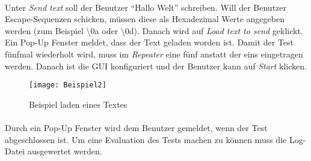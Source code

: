 \newpage

\paragraph{}
Unter \textit{Send text} soll der Benutzer "`Hallo Welt"' schreiben. Will der Benutzer Escape-Sequenzen schicken, müssen diese als Hexadezimal Werte angegeben werden (zum Beispiel \textbackslash0a oder \textbackslash0d). Danach wird auf \textit{Load text to send} geklickt. Ein Pop-Up Fenster meldet, dass der Text geladen worden ist. Damit der Test fünfmal wiederholt wird, muss im \textit{Repeater} eine fünf anstatt der eins eingetragen werden. Danach ist die GUI konfiguriert und der Benutzer kann auf \textit{Start} klicken.\\

\begin{figure}[h]
  \begin{center}
    \texttt{[image: Beispiel2]}
  		  \caption{Beispiel laden eines Textes}
     \label{Beispielbild 2}
  \end{center}
\end{figure}

\paragraph{}
Durch ein Pop-Up Fenster wird dem Benutzer gemeldet, wenn der Test abgeschlossen ist. Um eine Evaluation des Tests machen zu können muss die Log-Datei ausgewertet werden.


